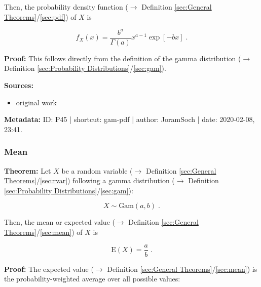 \documentclass[a4paper,12pt,twoside]{book}
\begin{document}
Then, the probability density function ($\rightarrow$ Definition \ref{sec:General Theorems}/\ref{sec:pdf}) of $X$ is

\begin{equation} \label{eq:gam-pdf-gam-pdf}
f_X(x) = \frac{b^a}{\Gamma(a)} x^{a-1} \exp[-b x] \; .
\end{equation}


\vspace{1em}
\textbf{Proof:} This follows directly from the definition of the gamma distribution ($\rightarrow$ Definition \ref{sec:Probability Distributions}/\ref{sec:gam}).


\vspace{1em}
\textbf{Sources:}
\begin{itemize}
\item original work\end{itemize}


\vspace{1em}
\textbf{Metadata:} ID: P45 | shortcut: gam-pdf | author: JoramSoch | date: 2020-02-08, 23:41.
\vspace{1em}



\subsubsection[\textbf{Mean}]{Mean} \label{sec:gam-mean}
\setcounter{equation}{0}

\textbf{Theorem:} Let $X$ be a random variable ($\rightarrow$ Definition \ref{sec:General Theorems}/\ref{sec:rvar}) following a gamma distribution ($\rightarrow$ Definition \ref{sec:Probability Distributions}/\ref{sec:gam}):

\begin{equation} \label{eq:gam-mean-gam}
X \sim \mathrm{Gam}(a, b) \; .
\end{equation}

Then, the mean or expected value ($\rightarrow$ Definition \ref{sec:General Theorems}/\ref{sec:mean}) of $X$ is

\begin{equation} \label{eq:gam-mean-gam-mean}
\mathrm{E}(X) = \frac{a}{b} \; .
\end{equation}


\vspace{1em}
\textbf{Proof:} The expected value ($\rightarrow$ Definition \ref{sec:General Theorems}/\ref{sec:mean}) is the probability-weighted average over all possible values:
\end{document}
